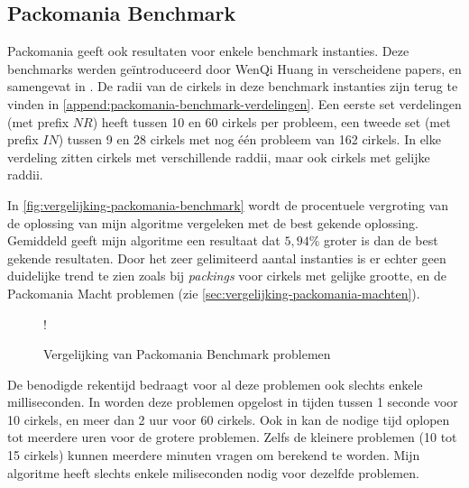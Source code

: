 \documentclass[12pt,a4paper,oneside]{book}
\begin{document}
\subsection{Packomania Benchmark} \label{sec:vergelijking-packomania-benchmark}

Packomania geeft ook resultaten voor enkele benchmark instanties. Deze benchmarks werden geïntroduceerd door WenQi Huang in verscheidene papers, en samengevat in \cite{huang2006new}.
De radii van de cirkels in deze benchmark instanties zijn terug te vinden in \autoref{append:packomania-benchmark-verdelingen}.
Een eerste set verdelingen (met prefix $NR$) heeft tussen 10 en 60 cirkels per probleem, een tweede set (met prefix $IN$) tussen 9 en 28 cirkels met nog één probleem van 162 cirkels.
In elke verdeling zitten cirkels met verschillende raddii, maar ook cirkels met gelijke raddii.

In \autoref{fig:vergelijking-packomania-benchmark} wordt de procentuele vergroting van de oplossing van mijn algoritme vergeleken met de best gekende oplossing.
Gemiddeld geeft mijn algoritme een resultaat dat $5,94\%$ groter is dan de best gekende resultaten.
Door het zeer gelimiteerd aantal instanties is er echter geen duidelijke trend te zien zoals bij \textit{packings} voor cirkels met gelijke grootte, en de Packomania Macht problemen (zie \autoref{sec:vergelijking-packomania-machten}).

\begin {figure}
	\centering
	 {!} {
	}
	\caption{Vergelijking van Packomania Benchmark problemen}
	\label{fig:vergelijking-packomania-benchmark}
\end {figure}

De benodigde rekentijd bedraagt voor al deze problemen ook slechts enkele milliseconden.
In \cite{ye2013iterated} worden deze problemen opgelost in tijden tussen 1 seconde voor 10 cirkels, en meer dan 2 uur voor 60 cirkels.
Ook in \cite{huang2013tabu} kan de nodige tijd oplopen tot meerdere uren voor de grotere problemen.
Zelfs de kleinere problemen (10 tot 15 cirkels) kunnen meerdere minuten vragen om berekend te worden.
Mijn algoritme heeft slechts enkele miliseconden nodig voor dezelfde problemen.
\end{document}

